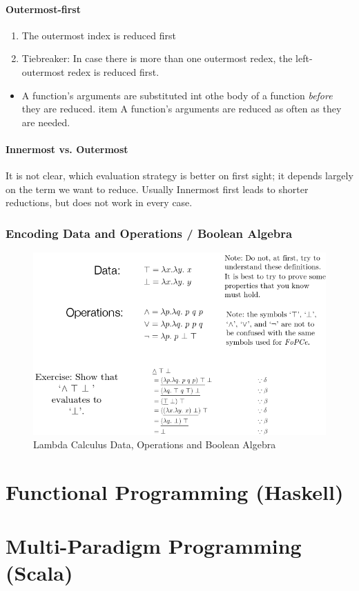 \paragraph{Outermost-first}

\begin{enumerate}
	\item The outermost index is reduced first
	\item Tiebreaker: In case there is more than one outermost redex, the left-outermost redex is reduced first.
\end{enumerate}


\begin{itemize}
	\item A function's arguments are substituted int othe body of a function \emph{before} they are reduced.
	item A function's arguments are reduced as often as they are needed.
\end{itemize}

\paragraph{Innermost vs. Outermost}

It is not clear, which evaluation strategy is better on first sight; it depends largely on the term we want to reduce. Usually Innermost first leads to shorter reductions, but does not work in every case.

\subsubsection{Encoding Data and Operations / Boolean Algebra}
\begin{figure}[H]
\centering
\includegraphics[width=0.7\linewidth]{images/lc_data_operations_algebra}
\caption{Lambda Calculus Data, Operations and Boolean Algebra}
\label{fig:lcdataoperationsalgebra}
\end{figure}



\section{Functional Programming (Haskell)}

\section{Multi-Paradigm Programming (Scala)}



